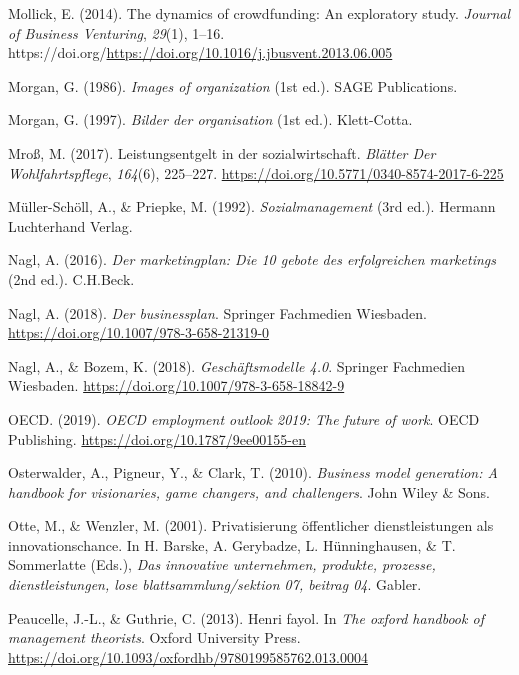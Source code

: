\documentclass[
  letterpaper,
]{book}
\newlength{\cslhangindent}
\newenvironment{CSLReferences}[2] %
 {\begin{list}{}{%
  \setlength{\itemindent}{0pt}
  \setlength{\leftmargin}{0pt}
  \setlength{\parsep}{0pt}
  \ifodd #1
   \setlength{\leftmargin}{\cslhangindent}
   \setlength{\itemindent}{-1\cslhangindent}
  \fi
  \setlength{\itemsep}{#2\baselineskip}}}
 {\end{list}}
\begin{document}
\begin{CSLReferences}{1}{0}
Mollick, E. (2014). The dynamics of crowdfunding: An exploratory study.
\emph{Journal of Business Venturing}, \emph{29}(1), 1--16.
https://doi.org/\url{https://doi.org/10.1016/j.jbusvent.2013.06.005}

Morgan, G. (1986). \emph{Images of organization} (1st ed.). SAGE
Publications.

Morgan, G. (1997). \emph{Bilder der organisation} (1st ed.).
Klett-Cotta.

Mroß, M. (2017). Leistungsentgelt in der sozialwirtschaft. \emph{Blätter
Der Wohlfahrtspflege}, \emph{164}(6), 225--227.
\url{https://doi.org/10.5771/0340-8574-2017-6-225}

Müller-Schöll, A., \& Priepke, M. (1992). \emph{Sozialmanagement} (3rd
ed.). Hermann Luchterhand Verlag.

Nagl, A. (2016). \emph{Der marketingplan: Die 10 gebote des
erfolgreichen marketings} (2nd ed.). C.H.Beck.

Nagl, A. (2018). \emph{Der businessplan}. Springer Fachmedien Wiesbaden.
\url{https://doi.org/10.1007/978-3-658-21319-0}

Nagl, A., \& Bozem, K. (2018). \emph{Geschäftsmodelle 4.0}. Springer
Fachmedien Wiesbaden. \url{https://doi.org/10.1007/978-3-658-18842-9}

OECD. (2019). \emph{OECD employment outlook 2019: The future of work}.
OECD Publishing. \url{https://doi.org/10.1787/9ee00155-en}

Osterwalder, A., Pigneur, Y., \& Clark, T. (2010). \emph{Business model
generation: A handbook for visionaries, game changers, and challengers}.
John Wiley \& Sons.

Otte, M., \& Wenzler, M. (2001). Privatisierung öffentlicher
dienstleistungen als innovationschance. In H. Barske, A. Gerybadze, L.
Hünninghausen, \& T. Sommerlatte (Eds.), \emph{Das innovative
unternehmen, produkte, prozesse, dienstleistungen, lose
blattsammlung/sektion 07, beitrag 04}. Gabler.

Peaucelle, J.-L., \& Guthrie, C. (2013). Henri fayol. In \emph{The
oxford handbook of management theorists}. Oxford University Press.
\url{https://doi.org/10.1093/oxfordhb/9780199585762.013.0004}


\end{CSLReferences}
\end{document}

